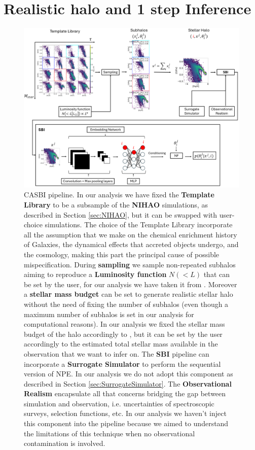 \section{Realistic halo and 1 step Inference}\label{sec:Realistic halo and 1 step Inference}


\begin{figure}[H]
    \centering
    \includegraphics[width=1\textwidth]{./figure/CASBI_complete.png}
    \caption{CASBI pipeline. In our analysis we have fixed the \textbf{Template Library} to be a subsample of the \textbf{NIHAO} simulations, as described in Section \ref{sec:NIHAO}, but it can be swapped with user-choice simulations. The choice of the Template Library incorporate all the assumption that we make on the chemical enrichment history of Galaxies, the dynamical effects that accreted objects undergo, and the cosmology, making this part the principal cause of possible mispecification. During \textbf{sampling} we sample non-repeated subhalos aiming to reproduce a \textbf{Luminosity function} $N(<L)$ that can be set by the user, for our analysis we have taken it from \cite{koposovLuminosityFunctionMilky2008}.  Moreover a \textbf{stellar mass budget} can be set to generate realistic stellar halo without the need of fixing the number of subhalos (even though a maximum number of subhalos is set in our analysis for computational reasons). In our analysis we fixed the stellar mass budget of the halo accordingly to \cite{deasonTotalStellarHalo2019}, but it can be set by the user accordingly to the estimated total stellar mass available in the observation that we want to infer on. The \textbf{SBI} pipeline can incorporate a \textbf{Surrogate Simulator} to perform the sequential version of NPE. In our analysis we do not adopt this component as described in Section \ref{sec:SurrogateSimulator}. The \textbf{Observational Realism} encapsulate all that concerns bridging the gap between simulation and observation, i.e. uncertainties of spectroscopic surveys, selection functions, etc. In our analysis we haven't inject this component into the pipeline because we aimed to understand the limitations of this technique when no observational contamination is involved.}
    \label{fig:CASBI_complete}
\end{figure}

